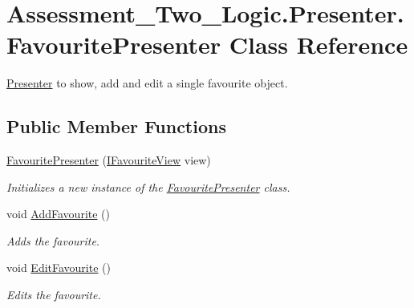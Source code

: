 \hypertarget{class_assessment___two___logic_1_1_presenter_1_1_favourite_presenter}{
\section{Assessment\_\-Two\_\-Logic.Presenter.FavouritePresenter Class Reference}
\label{class_assessment___two___logic_1_1_presenter_1_1_favourite_presenter}
}


\hyperlink{namespace_assessment___two___logic_1_1_presenter}{Presenter} to show, add and edit a single favourite object.  


\subsection*{Public Member Functions}
\begin{DoxyCompactItemize}
\item 
\hyperlink{class_assessment___two___logic_1_1_presenter_1_1_favourite_presenter_af0be18c58a7bde4166a853ba421006d9}{FavouritePresenter} (\hyperlink{interface_assessment___two___logic_1_1_interfaces_1_1_i_favourite_view}{IFavouriteView} view)
\begin{DoxyCompactList}\small\item\em Initializes a new instance of the \hyperlink{class_assessment___two___logic_1_1_presenter_1_1_favourite_presenter}{FavouritePresenter} class. \item\end{DoxyCompactList}\item 
void \hyperlink{class_assessment___two___logic_1_1_presenter_1_1_favourite_presenter_ae2914062104d406e133acba1e2beb923}{AddFavourite} ()
\begin{DoxyCompactList}\small\item\em Adds the favourite. \item\end{DoxyCompactList}\item 
void \hyperlink{class_assessment___two___logic_1_1_presenter_1_1_favourite_presenter_aef63c41f7aa829a3dab29157dfd63928}{EditFavourite} ()
\begin{DoxyCompactList}\small\item\em Edits the favourite. \item\end{DoxyCompactList}\end{DoxyCompactItemize}


